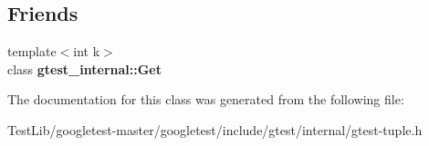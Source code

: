 \subsection*{Friends}
\begin{DoxyCompactItemize}
\item 
\mbox{\label{classstd_1_1tr1_1_1tuple_aeeed38755abdaa78587dd1eac9ccc950}} 
{\footnotesize template$<$int k$>$ }\\class {\bfseries gtest\+\_\+internal\+::\+Get}
\end{DoxyCompactItemize}


The documentation for this class was generated from the following file\+:\begin{DoxyCompactItemize}
\item 
Test\+Lib/googletest-\/master/googletest/include/gtest/internal/gtest-\/tuple.\+h\end{DoxyCompactItemize}
